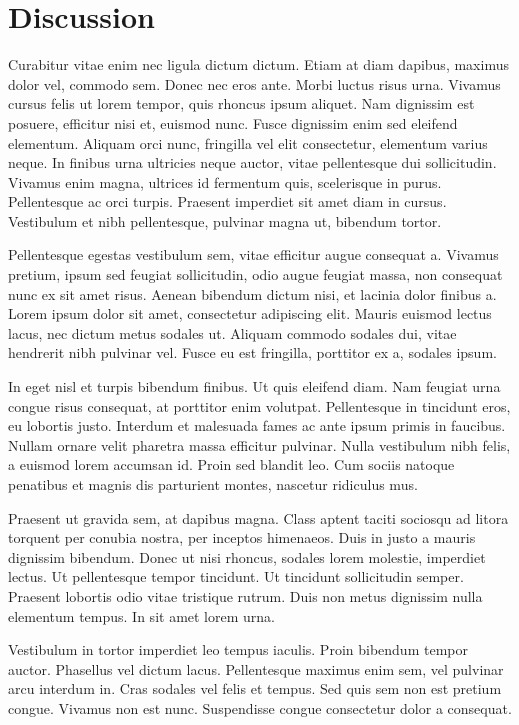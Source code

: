 \documentclass[]{aastex61}
\begin{document}
\section{Discussion} \label{sec:discussion}

Curabitur vitae enim nec ligula dictum dictum. Etiam at diam dapibus, maximus dolor vel, commodo sem. Donec nec eros ante. Morbi luctus risus urna. Vivamus cursus felis ut lorem tempor, quis rhoncus ipsum aliquet. Nam dignissim est posuere, efficitur nisi et, euismod nunc. Fusce dignissim enim sed eleifend elementum. Aliquam orci nunc, fringilla vel elit consectetur, elementum varius neque. In finibus urna ultricies neque auctor, vitae pellentesque dui sollicitudin. Vivamus enim magna, ultrices id fermentum quis, scelerisque in purus. Pellentesque ac orci turpis. Praesent imperdiet sit amet diam in cursus. Vestibulum et nibh pellentesque, pulvinar magna ut, bibendum tortor.

Pellentesque egestas vestibulum sem, vitae efficitur augue consequat a. Vivamus pretium, ipsum sed feugiat sollicitudin, odio augue feugiat massa, non consequat nunc ex sit amet risus. Aenean bibendum dictum nisi, et lacinia dolor finibus a. Lorem ipsum dolor sit amet, consectetur adipiscing elit. Mauris euismod lectus lacus, nec dictum metus sodales ut. Aliquam commodo sodales dui, vitae hendrerit nibh pulvinar vel. Fusce eu est fringilla, porttitor ex a, sodales ipsum.

In eget nisl et turpis bibendum finibus. Ut quis eleifend diam. Nam feugiat urna congue risus consequat, at porttitor enim volutpat. Pellentesque in tincidunt eros, eu lobortis justo. Interdum et malesuada fames ac ante ipsum primis in faucibus. Nullam ornare velit pharetra massa efficitur pulvinar. Nulla vestibulum nibh felis, a euismod lorem accumsan id. Proin sed blandit leo. Cum sociis natoque penatibus et magnis dis parturient montes, nascetur ridiculus mus.

Praesent ut gravida sem, at dapibus magna. Class aptent taciti sociosqu ad litora torquent per conubia nostra, per inceptos himenaeos. Duis in justo a mauris dignissim bibendum. Donec ut nisi rhoncus, sodales lorem molestie, imperdiet lectus. Ut pellentesque tempor tincidunt. Ut tincidunt sollicitudin semper. Praesent lobortis odio vitae tristique rutrum. Duis non metus dignissim nulla elementum tempus. In sit amet lorem urna.

\acknowledgments

Vestibulum in tortor imperdiet leo tempus iaculis. Proin bibendum tempor auctor. Phasellus vel dictum lacus. Pellentesque maximus enim sem, vel pulvinar arcu interdum in. Cras sodales vel felis et tempus. Sed quis sem non est pretium congue. Vivamus non est nunc. Suspendisse congue consectetur dolor a consequat.

\vspace{5mm}



%


\end{document}
